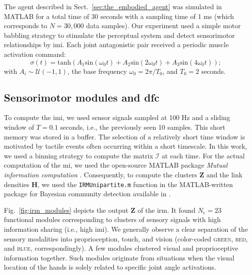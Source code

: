 \documentclass[letterpaper, 10 pt, conference]{ieeeconf}  %
\begin{document}
The agent described in Sect.~\ref{sec:the_embodied_agent} was simulated in MATLAB for a total time of 30 seconds with a sampling time of 1 ms (which corresponds to $N = 30,000$ data samples). Our experiment used a simple motor babbling strategy to stimulate the perceptual system and detect sensorimotor relationships by \ac{imi}. Each joint antagonistic pair received a periodic muscle activation command:
\begin{equation}\label{eq:motor_babbling_torques}
	\sigma(t) =  \text{tanh} \left( A_1 \text{sin}\left(\omega_0 t\right) + A_2 \text{sin}\left(2\omega_0 t\right) + A_3 \text{sin}\left(4\omega_0 t\right) \right);
\end{equation}	
with $A_i \sim \mathcal{U}(-1,1)$, the base frequency $\omega_0 = 2\pi/T_0$, and $T_0=2$ seconds.

\subsection{Sensorimotor modules and \ac{dfc}}
To compute the \ac{imi}, we used sensor signals sampled at 100 Hz and a sliding window of $T = 0.1$ seconds, i.e., the previously seen 10 samples. This short memory was stored in a buffer. The selection of a relatively short time window is motivated by tactile events often occurring within a short timescale. In this work, we used a binning strategy to compute the matrix $\bm{\mathcal{I}}$ at each time. For the actual computation of the \ac{mi}, we used the open-source MATLAB package \emph{Mutual information computation} \cite{PengMutualInformationcomputation}. Consequently, to compute the clusters $\bm{Z}$ and the link densities $\bm{H}$, we used the \texttt{IRMUnipartite.m} function in the MATLAB-written package for Bayesian community detection available in \cite{Morup2025IRM}. 

Fig.~\ref{fig:irm_modules} depicts the output $\bm{Z}$ of the \ac{irm}. It found $N_\text{c} = 23$ functional modules corresponding to clusters of sensory signals with high information sharing (i.e., high \ac{imi}). We generally observe a clear separation of the sensory modalities into proprioception, touch, and vision (color-coded \textsc{green}, \textsc{red}, and \textsc{blue}, correspondingly). A few modules clustered visual and proprioceptive information together. Such modules originate from situations when the visual location of the hands is solely related to specific joint angle activations. 
\end{document}
